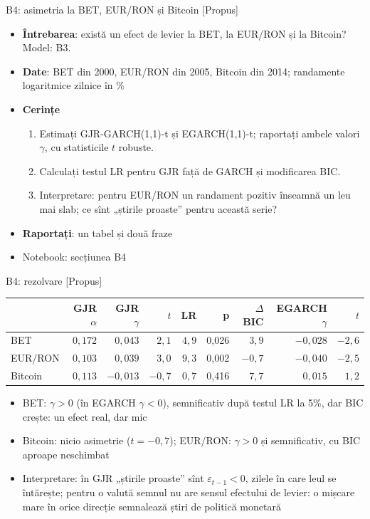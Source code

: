 \begin{frame}{B4: asimetria la BET, EUR/RON și Bitcoin [Propus]}
\itemsize{\footnotesize}
\begin{itemize}
\item \textbf{Întrebarea}: există un efect de levier la BET, la EUR/RON și la Bitcoin? Model: B3.
\item \textbf{Date}: BET din 2000, EUR/RON din 2005, Bitcoin din 2014; randamente logaritmice zilnice în \%
\item \textbf{Cerințe}
\begin{enumerate}
    \item Estimați GJR-GARCH(1,1)-t și EGARCH(1,1)-t; raportați ambele valori $\gamma$, cu statisticile $t$ robuste.
    \item Calculați testul LR pentru GJR față de GARCH și modificarea BIC.
    \item Interpretare: pentru EUR/RON un randament pozitiv înseamnă un leu mai slab; ce sînt „știrile proaste” pentru această serie?
\end{enumerate}
\item \textbf{Raportați}: un tabel și două fraze
\item Notebook: secțiunea B4
\end{itemize}
\end{frame}

\ifsolutions
\begin{frame}{B4: rezolvare [Propus]}
\itemsize{\footnotesize}
\begin{center}
\footnotesize
\begin{tabular}{lrrrrrrrr}
\toprule
& GJR $\alpha$ & GJR $\gamma$ & $t$ & LR & p & $\Delta$BIC & EGARCH $\gamma$ & $t$ \\
\midrule
BET & $0{,}172$ & $0{,}043$ & ${2{,}1}$ & $4{,}9$ & 0{,}026 & ${3{,}9}$ & ${-0{,}028}$ & ${-2{,}6}$ \\
EUR/RON & $0{,}103$ & $0{,}039$ & ${3{,}0}$ & $9{,}3$ & 0{,}002 & ${-0{,}7}$ & ${-0{,}040}$ & ${-2{,}5}$ \\
Bitcoin & $0{,}113$ & $-0{,}013$ & ${-0{,}7}$ & $0{,}7$ & 0{,}416 & ${7{,}7}$ & ${0{,}015}$ & ${1{,}2}$ \\
\bottomrule
\end{tabular}
\end{center}
\begin{itemize}
    \item BET: $\gamma > 0$ (în EGARCH $\gamma < 0$), semnificativ după testul LR la 5\%, dar BIC crește: un efect real, dar mic
    \item Bitcoin: nicio asimetrie ($t = -0{,}7$); EUR/RON: $\gamma > 0$ și semnificativ, cu BIC aproape neschimbat
    \item Interpretare: în GJR „știrile proaste” sînt $\varepsilon_{t-1} < 0$, zilele în care leul se întărește; pentru o valută semnul nu are sensul efectului de levier: o mișcare mare în orice direcție semnalează știri de politică monetară
\end{itemize}
\end{frame}
\fi

